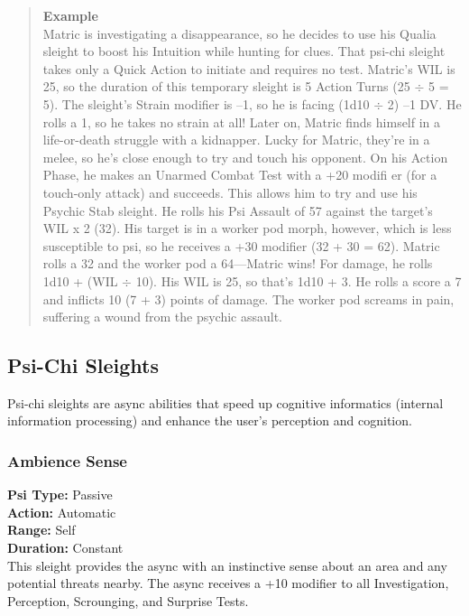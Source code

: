 \begin{quotation}
\textbf{Example}
\\
Matric is investigating a disappearance, so he
decides to use his Qualia sleight to boost his
Intuition while hunting for clues. That psi-chi
sleight takes only a Quick Action to initiate and
requires no test. Matric’s WIL is 25, so the duration
of this temporary sleight is 5 Action Turns
(25 $\div$ 5 = 5). The sleight’s Strain modifier is –1,
so he is facing (1d10 $\div$ 2) –1 DV. He rolls a 1, so
he takes no strain at all!
Later on, Matric finds himself in a life-or-death
struggle with a kidnapper. Lucky for Matric,
they’re in a melee, so he’s close enough to try
and touch his opponent. On his Action Phase, he
makes an Unarmed Combat Test with a +20 modifi
er (for a touch-only attack) and succeeds. This
allows him to try and use his Psychic Stab sleight.
He rolls his Psi Assault of 57 against the target’s
WIL x 2 (32). His target is in a worker pod morph,
however, which is less susceptible to psi, so he
receives a +30 modifier (32 + 30 = 62). Matric
rolls a 32 and the worker pod a 64—Matric wins!
For damage, he rolls 1d10 + (WIL $\div$ 10). His WIL
is 25, so that’s 1d10 + 3. He rolls a score a 7 and
inflicts 10 (7 + 3) points of damage. The worker
pod screams in pain, suffering a wound from the
psychic assault.

\end{quotation}



\subsection{Psi-Chi Sleights}
Psi-chi sleights are async abilities that speed up cognitive
informatics (internal information processing) and
enhance the user’s perception and cognition.

\subsubsection{Ambience Sense}
\textbf{Psi Type:} Passive \\ 
\textbf{Action:} Automatic \\ 
\textbf{Range:} Self \\ 
\textbf{Duration:} Constant \\
This sleight provides the async with an instinctive
sense about an area and any potential threats nearby.
The async receives a +10 modifier to all Investigation,
Perception, Scrounging, and Surprise Tests.

